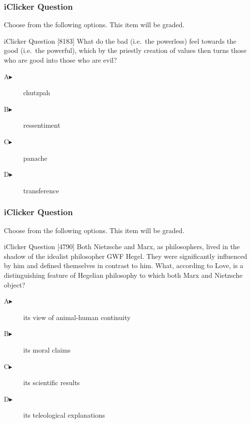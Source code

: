 \documentclass[xcolor=dvipsnames]{beamer}
\begin{document}
\begin{frame}
  \frametitle{iClicker Question}
Choose from the following options. This item will be graded.
\begin{block}{iClicker Question}
[8183] What do the bad (i.e.\ the powerless) feel towards the good (i.e.\ the powerful), which by the priestly creation of values then turns those who are good into those who are evil?
\end{block}
\begin{description}
\item[A\hspace{.2in}$\blacktriangleright$] chutzpah
\item[B\hspace{.2in}$\blacktriangleright$] ressentiment
\item[C\hspace{.2in}$\blacktriangleright$] panache
\item[D\hspace{.2in}$\blacktriangleright$] transference
\end{description}
\end{frame}\begin{frame}
  \frametitle{iClicker Question}
Choose from the following options. This item will be graded.
\begin{block}{iClicker Question}
  [4790] Both Nietzsche and Marx, as philosophers, lived in the shadow of the idealist philosopher GWF Hegel. They were significantly influenced by him and defined themselves in contrast to him. What, according to Love, is a distinguishing feature of Hegelian philosophy to which both Marx and Nietzsche object?
\end{block}
\begin{description}
\item[A\hspace{.2in}$\blacktriangleright$] its view of animal-human continuity
\item[B\hspace{.2in}$\blacktriangleright$] its moral claims
\item[C\hspace{.2in}$\blacktriangleright$] its scientific results
\item[D\hspace{.2in}$\blacktriangleright$] its teleological explanations
\end{description}
\end{frame}
\end{document}
